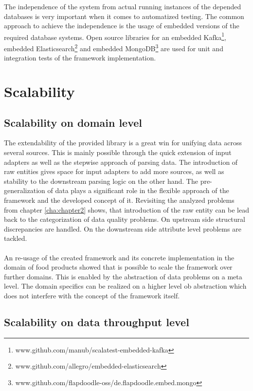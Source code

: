 The independence of the system from actual running instances of the depended databases is very important when it comes to automatized testing. The common approach to achieve the independence is the usage of embedded versions of the required database systems. Open source libraries for an embedded Kafka\footnote{www.github.com/manub/scalatest-embedded-kafka}, embedded Elasticsearch\footnote{www.github.com/allegro/embedded-elasticsearch} and embedded MongoDB\footnote{www.github.com/flapdoodle-oss/de.flapdoodle.embed.mongo} are used for unit and integration tests of the framework implementation.

\section{Scalability\label{sec:scal}}

\subsection{Scalability on domain level}

The extendability of the provided library is a great win for unifying data across several sources. This is mainly possible through the quick extension of input adapters as well as the stepwise approach of parsing data. The introduction of raw entities gives space for input adapters to add more sources, as well as stability to the downstream parsing logic on the other hand. The pre-generalization of data plays a significant role in the flexible approach of the framework and the developed concept of it. Revisiting the analyzed problems from chapter \ref{cha:chapter2} shows, that introduction of the raw entity can be lead back to the categorization of data quality problems. On upstream side structural discrepancies are handled. On the downstream side attribute level problems are tackled.
\\\\
An re-usage of the created framework and its concrete implementation in the domain of food products showed that is possible to scale the framework over further domains. This is enabled by the abstraction of data problems on a meta level. The domain specifics can be realized on a higher level ob abstraction which does not interfere with the concept of the framework itself.

\subsection{Scalability on data throughput level}

